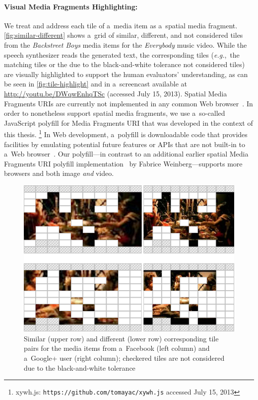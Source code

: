 \paragraph{Visual Media Fragments Highlighting:}

We treat and address each tile of a~media item
as a~spatial media fragment. \autoref{fig:similar-different}
shows a~grid of similar, different, and not considered tiles
from the \emph{Backstreet Boys} media items for the \emph{Everybody} music video.
While the speech synthesizer reads the generated text,
the corresponding tiles (\emph{e.g.},~the matching tiles
or the due to the black-and-white tolerance not considered tiles)
are visually highlighted to support the human evaluators' understanding,
as can be seen in \autoref{fig:tile-highlight}
and in a~screencast available at \url{http://youtu.be/DWqwEnhqTSc} (accessed July 15, 2013).
Spatial Media Fragments URIs are currently not implemented
in any common Web browser~\cite{weinberg2013polyfill}.
In order to nonetheless support spatial media fragments,
we use a~so-called JavaScript polyfill for Media Fragments URI
that was developed in the context of this thesis.%
\footnote{xywh.js: \texttt{https://github.com/tomayac/xywh.js} accessed July 15, 2013}
In Web development, a~polyfill is downloadable code that provides facilities
by emulating potential future features or APIs
that are not built-in to a~Web browser~\cite{sharp2010polyfill}.
Our polyfill---in contrast to an additional earlier
spatial Media Fragments URI polyfill implementation~\cite{weinberg2013polyfill}
by Fabrice Weinberg---supports more browsers and both image \emph{and} video.

\begin{figure}[!ht]
  \centering
  \includegraphics[width=0.75\linewidth]{./similar-different.png}
  \caption[Similar and different corresponding tile pairs]{Similar (upper row) and different (lower row) corresponding tile pairs for the media items from a~Facebook (left column) and a~Google+ user (right column); checkered tiles are not considered due to the black-and-white tolerance}
  \label{fig:similar-different}
\end{figure}

